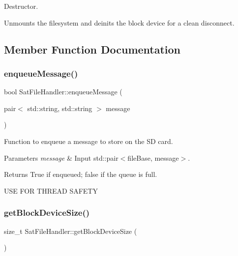 Destructor. 

Unmounts the filesystem and deinits the block device for a clean disconnect. 

\subsection{Member Function Documentation}
\mbox{\label{class_sat_file_handler_a9f5a3c0ee440bf5a45f49add4dd2f04d}} 
\subsubsection{\texorpdfstring{enqueueMessage()}{enqueueMessage()}}
{\footnotesize\ttfamily bool Sat\+File\+Handler\+::enqueue\+Message (\begin{DoxyParamCaption}\item[{pair$<$ std\+::string, std\+::string $>$}]{message }\end{DoxyParamCaption})}



Function to enqueue a message to store on the SD card. 


\begin{DoxyParams}{Parameters}
{\em message} & Input std\+::pair$<$file\+Base, message$>$.\\
\hline
\end{DoxyParams}
\begin{DoxyReturn}{Returns}
True if enqueued; false if the queue is full.
\end{DoxyReturn}
U\+SE F\+OR T\+H\+R\+E\+AD S\+A\+F\+E\+TY \mbox{\label{class_sat_file_handler_a1a01017636190f9c3e14633564468882}} 
\subsubsection{\texorpdfstring{getBlockDeviceSize()}{getBlockDeviceSize()}}
{\footnotesize\ttfamily size\+\_\+t Sat\+File\+Handler\+::get\+Block\+Device\+Size (\begin{DoxyParamCaption}{ }\end{DoxyParamCaption})}



